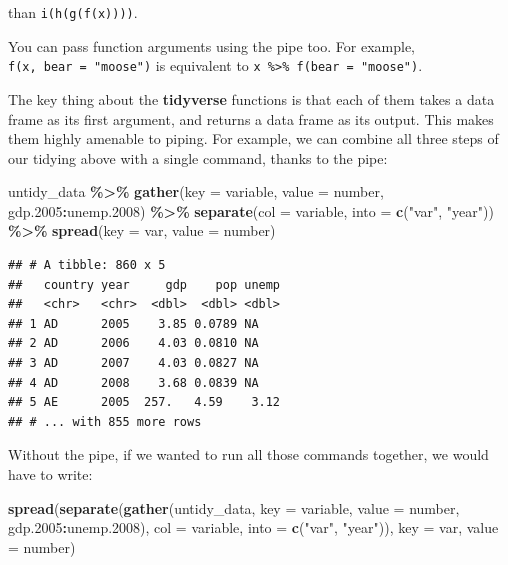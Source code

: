 \documentclass[
  12pt,
  oneside,openany]{book}
\newenvironment{Shaded}{\begin{snugshade}}{\end{snugshade}}
\newcommand{\DataTypeTok}[1]{\textcolor[rgb]{0.13,0.29,0.53}{#1}}
\newcommand{\FloatTok}[1]{\textcolor[rgb]{0.00,0.00,0.81}{#1}}
\newcommand{\KeywordTok}[1]{\textcolor[rgb]{0.13,0.29,0.53}{\textbf{#1}}}
\newcommand{\NormalTok}[1]{#1}
\newcommand{\OperatorTok}[1]{\textcolor[rgb]{0.81,0.36,0.00}{\textbf{#1}}}
\newcommand{\StringTok}[1]{\textcolor[rgb]{0.31,0.60,0.02}{#1}}
\begin{document}
than \texttt{i(h(g(f(x))))}.

You can pass function arguments using the pipe too. For example, \texttt{f(x,\ bear\ =\ "moose")} is equivalent to \texttt{x\ \%\textgreater{}\%\ f(bear\ =\ "moose")}.

The key thing about the \textbf{tidyverse} functions is that each of them takes a data frame as its first argument, and returns a data frame as its output. This makes them highly amenable to piping. For example, we can combine all three steps of our tidying above with a single command, thanks to the pipe:

\begin{Shaded}
\begin{Highlighting}[]
\NormalTok{untidy\_data }\OperatorTok{\%>\%}
\StringTok{  }\KeywordTok{gather}\NormalTok{(}\DataTypeTok{key =}\NormalTok{ variable,}
         \DataTypeTok{value =}\NormalTok{ number,}
\NormalTok{         gdp}\FloatTok{.2005}\OperatorTok{:}\NormalTok{unemp}\FloatTok{.2008}\NormalTok{) }\OperatorTok{\%>\%}
\StringTok{  }\KeywordTok{separate}\NormalTok{(}\DataTypeTok{col =}\NormalTok{ variable,}
           \DataTypeTok{into =} \KeywordTok{c}\NormalTok{(}\StringTok{"var"}\NormalTok{, }\StringTok{"year"}\NormalTok{)) }\OperatorTok{\%>\%}
\StringTok{  }\KeywordTok{spread}\NormalTok{(}\DataTypeTok{key =}\NormalTok{ var,}
         \DataTypeTok{value =}\NormalTok{ number)}
\end{Highlighting}
\end{Shaded}

\begin{verbatim}
## # A tibble: 860 x 5
##   country year     gdp    pop unemp
##   <chr>   <chr>  <dbl>  <dbl> <dbl>
## 1 AD      2005    3.85 0.0789 NA   
## 2 AD      2006    4.03 0.0810 NA   
## 3 AD      2007    4.03 0.0827 NA   
## 4 AD      2008    3.68 0.0839 NA   
## 5 AE      2005  257.   4.59    3.12
## # ... with 855 more rows
\end{verbatim}

Without the pipe, if we wanted to run all those commands together, we would have to write:

\begin{Shaded}
\begin{Highlighting}[]
\KeywordTok{spread}\NormalTok{(}\KeywordTok{separate}\NormalTok{(}\KeywordTok{gather}\NormalTok{(untidy\_data,}
                       \DataTypeTok{key =}\NormalTok{ variable,}
                       \DataTypeTok{value =}\NormalTok{ number,}
\NormalTok{                       gdp}\FloatTok{.2005}\OperatorTok{:}\NormalTok{unemp}\FloatTok{.2008}\NormalTok{),}
                \DataTypeTok{col =}\NormalTok{ variable,}
                \DataTypeTok{into =} \KeywordTok{c}\NormalTok{(}\StringTok{"var"}\NormalTok{, }\StringTok{"year"}\NormalTok{)),}
       \DataTypeTok{key =}\NormalTok{ var,}
       \DataTypeTok{value =}\NormalTok{ number)}
\end{Highlighting}
\end{Shaded}
\end{document}
